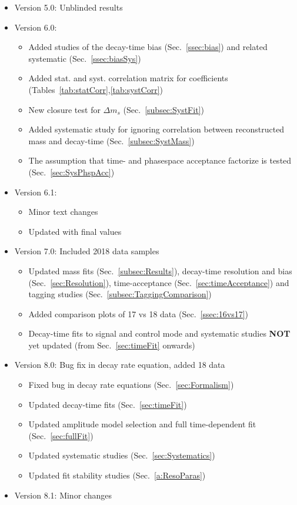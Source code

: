 \begin{itemize}
			\item Version 5.0:  Unblinded results 
			
			\item Version 6.0:  
				\begin{itemize}
					\item Added studies of the decay-time bias (Sec.~\ref{ssec:bias}) and related systematic (Sec.~\ref{ssec:biasSys})
					\item Added stat. and syst. correlation matrix for \CP coefficients  (Tables~\ref{tab:statCorr},\ref{tab:systCorr})
					\item New closure test for $\Delta m_s$ (Sec.~\ref{subsec:SystFit})
					\item Added systematic study for ignoring correlation between reconstructed mass and decay-time (Sec.~\ref{subsec:SystMass})
					\item The assumption that time- and phasespace acceptance factorize is tested (Sec.~\ref{sec:SysPhspAcc})
				\end{itemize}
				
				
			\item Version 6.1:  
				\begin{itemize}
					\item Minor text changes
					\item Updated with final values
				\end{itemize}	

 
			\item Version 7.0:  Included 2018 data samples
				\begin{itemize}
					\item Updated mass fits (Sec.~\ref{subsec:Results}), decay-time resolution and bias (Sec.~\ref{sec:Resolution}), 
					time-acceptance (Sec.~\ref{sec:timeAcceptance}) and tagging studies (Sec.~\ref{subsec:TaggingComparison})
					\item Added comparison plots of 17 vs 18 data (Sec.~\ref{ssec:16vs17}) 
					\item Decay-time fits to signal and control mode and systematic studies \textbf{NOT} yet updated (from Sec.~\ref{sec:timeFit} onwards)
				\end{itemize}	
				
			\item Version 8.0:  Bug fix in decay rate equation, added 18 data
				\begin{itemize}
					\item Fixed bug in decay rate equations (Sec.~\ref{sec:Formalism})
					\item Updated decay-time fits  (Sec.~\ref{sec:timeFit})
					\item Updated amplitude model selection and full time-dependent fit  (Sec.~\ref{sec:fullFit})
					\item Updated systematic studies  (Sec.~\ref{sec:Systematics})
					\item Updated fit stability studies (Sec.~\ref{a:ResoParas})
				\end{itemize}	
				
			\item Version 8.1:  Minor changes



\end{itemize}
